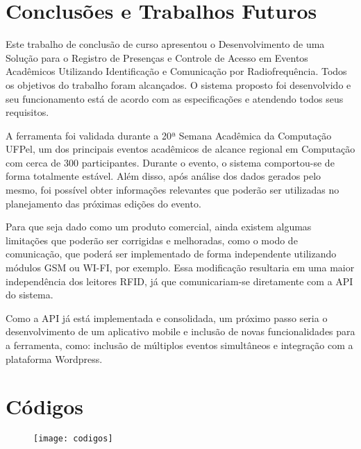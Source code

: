 \documentclass[tcc,capa]{texufpel}
\begin{document}
    
\chapter{Conclusões e Trabalhos Futuros}
    
        Este trabalho de conclusão de curso apresentou o Desenvolvimento de uma Solução para o Registro de Presenças e Controle de Acesso em Eventos Acadêmicos Utilizando Identificação e Comunicação por Radiofrequência. Todos os objetivos do trabalho foram alcançados. O sistema proposto foi desenvolvido e seu funcionamento está de acordo com as especificações e atendendo todos seus requisitos.
        
        A ferramenta foi validada durante a 20ª Semana Acadêmica da Computação UFPel, um dos principais eventos acadêmicos de alcance regional em Computação com cerca de 300 participantes. Durante o evento, o sistema comportou-se de forma totalmente estável. Além disso, após análise dos dados gerados pelo mesmo, foi possível obter informações relevantes que poderão ser utilizadas no planejamento das próximas edições do evento.
        
          
        Para que seja dado como um produto comercial, ainda existem algumas limitações que poderão ser corrigidas e melhoradas, como o modo de comunicação, que poderá ser implementado de forma independente utilizando módulos GSM ou WI-FI, por exemplo. Essa modificação resultaria em uma maior independência dos leitores RFID, já que comunicariam-se diretamente com a API do sistema.
        
         Como a API já está implementada e consolidada, um próximo passo seria o desenvolvimento de um aplicativo mobile e inclusão de novas funcionalidades para a ferramenta, como: inclusão de múltiplos eventos simultâneos e integração com a plataforma Wordpress.
         








\makecover


\annex 
\chapter{Códigos}
\label{anexoA}

    \begin{figure}[H]
         \centering 
         \texttt{[image: codigos]}
    \end{figure}
    
\end{document}
